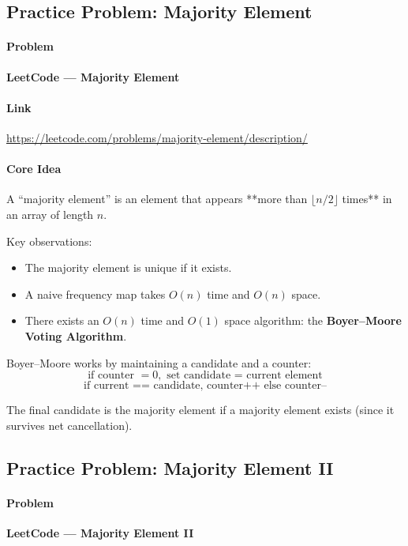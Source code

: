 \documentclass[11pt]{article}
\begin{document}
\subsection{Practice Problem: Majority Element}

\paragraph{Problem}
\textbf{LeetCode — Majority Element}

\paragraph{Link}
\url{https://leetcode.com/problems/majority-element/description/}

\paragraph{Core Idea}

A “majority element” is an element that appears **more than $\lfloor n/2 \rfloor$ times** in an array of length $n$.

Key observations:
\begin{itemize}
    \item The majority element is unique if it exists.
    \item A naive frequency map takes $O(n)$ time and $O(n)$ space.
    \item There exists an $O(n)$ time and $O(1)$ space algorithm:
          the \textbf{Boyer–Moore Voting Algorithm}.
\end{itemize}

Boyer–Moore works by maintaining a candidate and a counter:
\[
\text{if counter } = 0, \text{ set candidate = current element}
\]
\[
\text{if current == candidate, counter++ else counter--}
\]

The final candidate is the majority element if a majority element exists (since it survives net cancellation).


\subsection{Practice Problem: Majority Element II}

\paragraph{Problem}
\textbf{LeetCode — Majority Element II}
\end{document}
